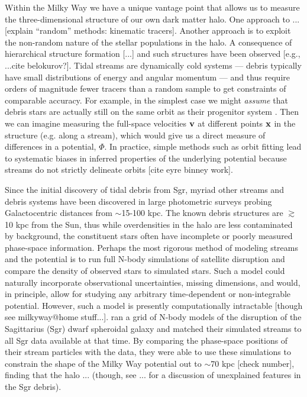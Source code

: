 \documentclass[letterpaper,12pt,preprint]{aastex}
\begin{document}
Within the Milky Way we have a unique vantage point that allows us to measure the three-dimensional structure of our own dark matter halo. One approach to ... [explain ``random'' methods: kinematic tracers]. Another approach is to exploit the non-random nature of the stellar populations in the halo. A consequence of hierarchical structure formation [...] and such structures have been observed [e.g., ...cite belokurov?]. Tidal streams are dynamically cold systems --- debris typically have small distributions of energy and angular momentum --- and thus require orders of magnitude fewer tracers than a random sample to get constraints of comparable accuracy. For example, in the simplest case we might {\it assume} that debris stars are actually still on the same orbit as their progenitor system \citep[a \emph{wrong} assumption, see e.g.][]{eyre}. Then we can imagine measuring the full-space velocities ${\bf v}$ at different points ${\bf x}$ in the structure (e.g. along a stream), which would give us a direct measure of differences in a potential, $\Phi$. In practice, simple methods such as orbit fitting lead to systematic biases in inferred properties of the underlying potential because streams do not strictly delineate orbits [cite eyre binney work]. 

Since the initial discovery of tidal debris from Sgr, myriad other streams and debris systems have been discovered in large photometric surveys probing Galactocentric distances from $\sim$15-100 kpc. The known debris structures are $\gtrsim$10 kpc from the Sun, thus while overdensities in the halo are less contaminated by background, the constituent stars often have incomplete or poorly measured phase-space information. Perhaps the most rigorous method of modeling streams and the potential is to run full N-body simulations of satellite disruption and compare the density of observed stars to simulated stars. Such a model could naturally incorporate observational uncertainties, missing dimensions, and would, in principle, allow for studying any arbitrary time-dependent or non-integrable potential. However, such a model is presently computationally intractable [though see milkyway@home stuff...]. \cite[][hereafter LM10]{lm10} ran a grid of N-body models of the disruption of the Sagittarius (Sgr) dwarf spheroidal galaxy and matched their simulated streams to all Sgr data available at that time. By comparing the phase-space positions of their stream particles with the data, they were able to use these simulations to constrain the shape of the Milky Way potential out to $\sim$70 kpc [check number], finding that the halo ... (though, see ... for a discussion of unexplained features in the Sgr debris). 
\end{document}

